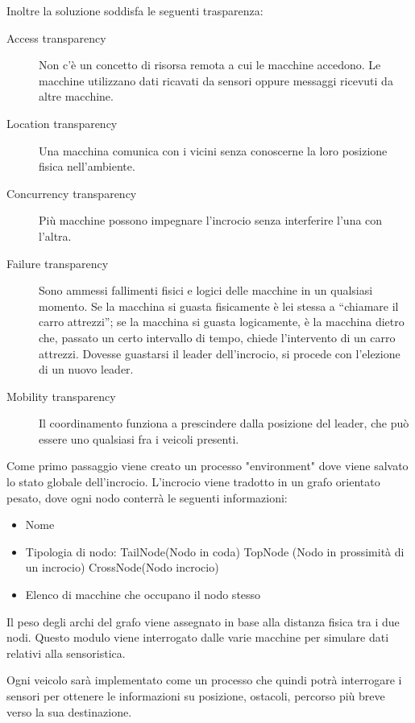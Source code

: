 \documentclass{memoir}
\begin{document}
Inoltre la soluzione soddisfa le seguenti trasparenza:
\begin{description}
\item[Access transparency] Non c'è un concetto di risorsa remota a cui le
  macchine accedono. Le macchine utilizzano dati ricavati da sensori oppure
  messaggi ricevuti da altre macchine.
\item[Location transparency] Una macchina comunica con i vicini senza conoscerne
  la loro posizione fisica nell'ambiente.
\item[Concurrency transparency] Più macchine possono impegnare l'incrocio senza
  interferire l'una con l'altra.
\item[Failure transparency] Sono ammessi fallimenti fisici e logici delle
  macchine in un qualsiasi momento. Se la macchina si guasta fisicamente è lei
  stessa a ``chiamare il carro attrezzi''; se la macchina si guasta logicamente,
  è la macchina dietro che, passato un certo intervallo di tempo, chiede
  l'intervento di un carro attrezzi. Dovesse guastarsi il leader dell'incrocio,
  si procede con l'elezione di un nuovo leader.
\item[Mobility transparency] Il coordinamento funziona a prescindere dalla
  posizione del leader, che può essere uno qualsiasi fra i veicoli presenti.
\end{description}


\newpage

Come primo passaggio viene creato un processo "environment" dove viene salvato
lo stato globale dell'incrocio. L'incrocio viene tradotto in un grafo orientato
pesato, dove ogni nodo conterrà le seguenti informazioni:
\begin{itemize}
\item Nome
\item Tipologia di nodo: TailNode(Nodo in coda) TopNode (Nodo in prossimità di
  un incrocio) CrossNode(Nodo incrocio)
\item Elenco di macchine che occupano il nodo stesso
\end{itemize}
Il peso degli archi del grafo viene assegnato in base alla distanza fisica tra i
due nodi.
Questo modulo viene interrogato dalle varie macchine per simulare dati relativi
alla sensoristica.

Ogni veicolo sarà implementato come un processo che quindi potrà interrogare i
sensori per ottenere le informazioni su posizione, ostacoli, percorso più breve
verso la sua destinazione.
\end{document}
